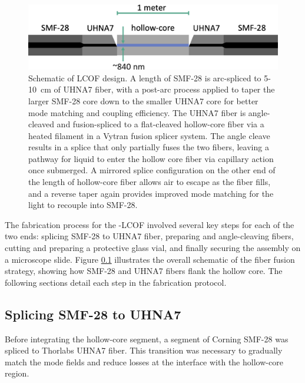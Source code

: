\begin{figure}[t]
  \centering
  \includegraphics[width=\textwidth]{figs/3-Cooling/LCOFdiagram.png}
  \caption{Schematic of \ac{LCOF} design. A length of \ac{SMF-28} is arc-spliced to 5-\SI{10}{\centi\meter} of \ac{UHNA7} fiber, with a post-arc process applied to taper the larger \ac{SMF-28} core down to the smaller \ac{UHNA7} core for better mode matching and coupling efficiency. The \ac{UHNA7} fiber is angle-cleaved and fusion-spliced to a flat-cleaved hollow-core fiber via a heated filament in a Vytran fusion splicer system. The angle cleave results in a splice that only partially fuses the two fibers, leaving a pathway for liquid to enter the hollow core fiber via capillary action once submerged. A mirrored splice configuration on the other end of the length of hollow-core fiber allows air to escape as the fiber fills, and a reverse taper again provides improved mode matching for the light to recouple into \ac{SMF-28}.}
  \label{fig:LCOF diagram}
\end{figure}

The fabrication process for the -\ac{LCOF} involved several key steps for each of the two ends: splicing \ac{SMF-28} to \ac{UHNA7} fiber, preparing and angle-cleaving fibers, cutting and preparing a protective glass vial, and finally securing the assembly on a microscope slide. Figure \ref{} illustrates the overall schematic of the fiber fusion strategy, showing how \ac{SMF-28} and \ac{UHNA7} fibers flank the hollow core. The following sections detail each step in the fabrication protocol.

\subsection{Splicing \acs{SMF-28} to \acs{UHNA7}}

Before integrating the hollow-core segment, a segment of Corning \ac{SMF-28} was spliced to Thorlabs \ac{UHNA7} fiber. This transition was necessary to gradually match the mode fields and reduce losses at the interface with the hollow-core region.

